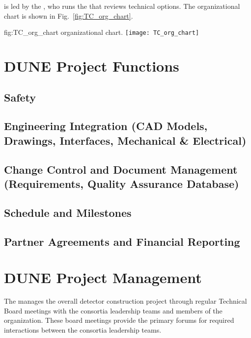  is led by the , who runs the  that
reviews  technical options. The  organizational
chart is shown in Fig.~\ref{fig:TC_org_chart}.
\begin{dunefigure}{fig:TC_org_chart}
  {  organizational chart.}
  \texttt{[image: TC\_org\_chart]}
\end{dunefigure}

\section{DUNE Project Functions}
\label{sec:pm_functions}


\subsection{Safety}
\subsection{Engineering Integration (CAD Models, Drawings, Interfaces, Mechanical \& Electrical)}
\subsection{Change Control and Document Management (Requirements, Quality Assurance Database)}
\subsection{Schedule and Milestones}
\subsection{Partner Agreements and Financial Reporting}

\section{DUNE Project Management}
\label{sec:pm}



The  manages the overall detector construction project
through regular Technical Board meetings with the consortia leadership
teams and members of the  organization.  These board
meetings provide the primary forums for required interactions between
the consortia leadership teams.

